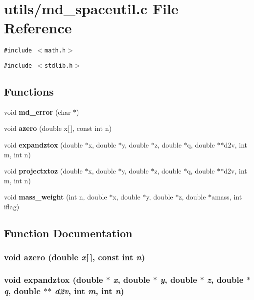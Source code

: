 \section{utils/md\_\-spaceutil.c File Reference}
\label{md__spaceutil_8c}
{\tt \#include $<$math.h$>$}\par
{\tt \#include $<$stdlib.h$>$}\par
\subsection*{Functions}
\begin{CompactItemize}
\item 
void {\bf md\_\-error} (char $\ast$)
\item 
void {\bf azero} (double x[$\,$], const int n)
\item 
void {\bf expandztox} (double $\ast$x, double $\ast$y, double $\ast$z, double $\ast$q, double $\ast$$\ast$d2v, int m, int n)
\item 
void {\bf projectxtoz} (double $\ast$x, double $\ast$y, double $\ast$z, double $\ast$q, double $\ast$$\ast$d2v, int m, int n)
\item 
void {\bf mass\_\-weight} (int n, double $\ast$x, double $\ast$y, double $\ast$z, double $\ast$amass, int iflag)
\end{CompactItemize}


\subsection{Function Documentation}
\subsubsection{\setlength{\rightskip}{0pt plus 5cm}void azero (double {\em x}[$\,$], const int {\em n})}\label{md__spaceutil_8c_57d362ca4b4c921cfc6a93c28a5e913f}


\subsubsection{\setlength{\rightskip}{0pt plus 5cm}void expandztox (double $\ast$ {\em x}, double $\ast$ {\em y}, double $\ast$ {\em z}, double $\ast$ {\em q}, double $\ast$$\ast$ {\em d2v}, int {\em m}, int {\em n})}\label{md__spaceutil_8c_fcd77b88bed9ee9e545e80c0569ad9c1}


